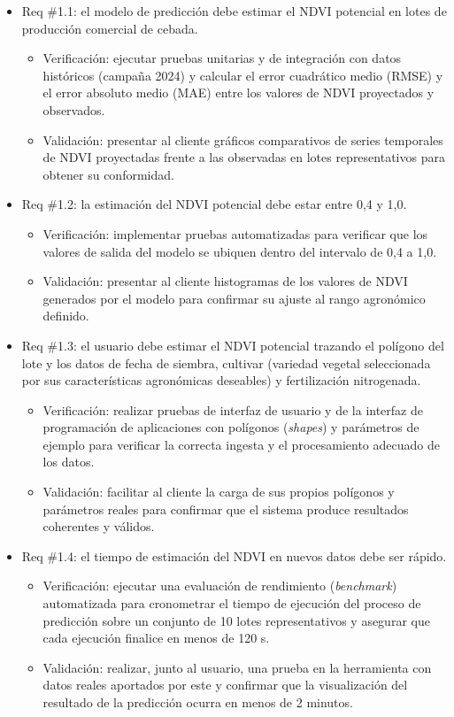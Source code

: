 \documentclass[
11pt, %
]{charter}
\begin{document}
\begin{itemize}
    \item Req \#1.1: el modelo de predicción debe estimar el NDVI potencial en lotes de producción comercial de cebada.
    \begin{itemize}
        \item Verificación: ejecutar pruebas unitarias y de integración con datos históricos (campaña 2024) y calcular el error cuadrático medio (RMSE) y el error absoluto medio (MAE) entre los valores de NDVI proyectados y observados.
        \item Validación: presentar al cliente gráficos comparativos de series temporales de NDVI proyectadas frente a las observadas en lotes representativos para obtener su conformidad.
    \end{itemize}

    \item Req \#1.2: la estimación del NDVI potencial debe estar entre 0,4 y 1,0.
    \begin{itemize}
        \item Verificación: implementar pruebas automatizadas para verificar que los valores de salida del modelo se ubiquen dentro del intervalo de 0,4 a 1,0.
        \item Validación: presentar al cliente histogramas de los valores de NDVI generados por el modelo para confirmar su ajuste al rango agronómico definido.
    \end{itemize}

    \item Req \#1.3: el usuario debe estimar el NDVI potencial trazando el polígono del lote y los datos de fecha de siembra, cultivar (variedad vegetal seleccionada por sus características agronómicas deseables) y fertilización nitrogenada.
    \begin{itemize}
        \item Verificación: realizar pruebas de interfaz de usuario y de la interfaz de programación de aplicaciones con polígonos (\textit{shapes}) y parámetros de ejemplo para verificar la correcta ingesta y el procesamiento adecuado de los datos.
        \item Validación: facilitar al cliente la carga de sus propios polígonos y parámetros reales para confirmar que el sistema produce resultados coherentes y válidos.
    \end{itemize}

    \item Req \#1.4: el tiempo de estimación del NDVI en nuevos datos debe ser rápido.
    \begin{itemize}
        \item Verificación: ejecutar una evaluación de rendimiento (\textit{benchmark}) automatizada para cronometrar el tiempo de ejecución del proceso de predicción sobre un conjunto de 10 lotes representativos y asegurar que cada ejecución finalice en menos de 120 s.
        \item Validación: realizar, junto al usuario, una prueba en la herramienta con datos reales aportados por este y confirmar que la visualización del resultado de la predicción ocurra en menos de 2 minutos.
    \end{itemize}


\end{itemize}
\end{document}
